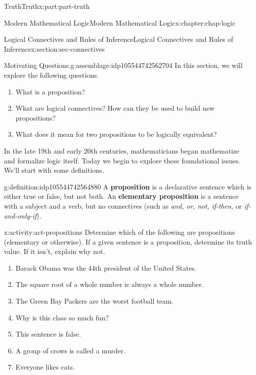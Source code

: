 \documentclass[oneside,10pt,]{book}
\newcommand{\terminology}[1]{\textbf{#1}}
\numberwithin{equation}{section}
\begin{document}
\begin{partptx}{Truth}{}{Truth}{}{}{x:part:part-truth}
\begin{chapterptx}{Modern Mathematical Logic}{}{Modern Mathematical Logic}{}{}{x:chapter:chap-logic}
%
%
\typeout{************************************************}
\typeout{************************************************}
%
\begin{sectionptx}{Logical Connectives and Rules of Inference}{}{Logical Connectives and Rules of Inference}{}{}{x:section:sec-connectives}
\begin{assemblage}{Motivating Questions.}{g:assemblage:idp105544742562704}%
In this section, we will explore the following questions. %
\begin{enumerate}
\item{}What is a proposition?%
\item{}What are logical connectives? How can they be used to build new propositions?%
\item{}What does it mean for two propositions to be logically equivalent?%
\end{enumerate}
%
\end{assemblage}
In the late 19th and early 20th centuries, mathematicians began mathematize and formalize logic itself. Today we begin to explore these foundational issues. We'll start with some definitions.%
\begin{definition}{}{g:definition:idp105544742564880}%
%
%
%
A \terminology{proposition} is a declarative sentence which is either true or false, but not both. An \terminology{elementary proposition} is a sentence with a subject and a verb, but no connectives (such as \emph{and, or, not, if-then,} or \emph{if-and-only-if}).%
\end{definition}
\begin{activity}{}{x:activity:act-propositions}%
Determine which of the following are propositions (elementary or otherwise). If a given sentence is a proposition, determine its truth value. If it isn't, explain why not.%
%
\begin{enumerate}
\item{}Barack Obama was the 44th president of the United States.%
\item{}The square root of a whole number is always a whole number.%
\item{}The Green Bay Packers are the worst football team.%
\item{}Why is this class so much fun?%
\item{}This sentence is false.%
\item{}A group of crows is called a murder.%
\item{}Everyone likes cats.%

\end{enumerate}
\end{activity}
\end{sectionptx}
\end{chapterptx}
\end{partptx}
\end{document}
